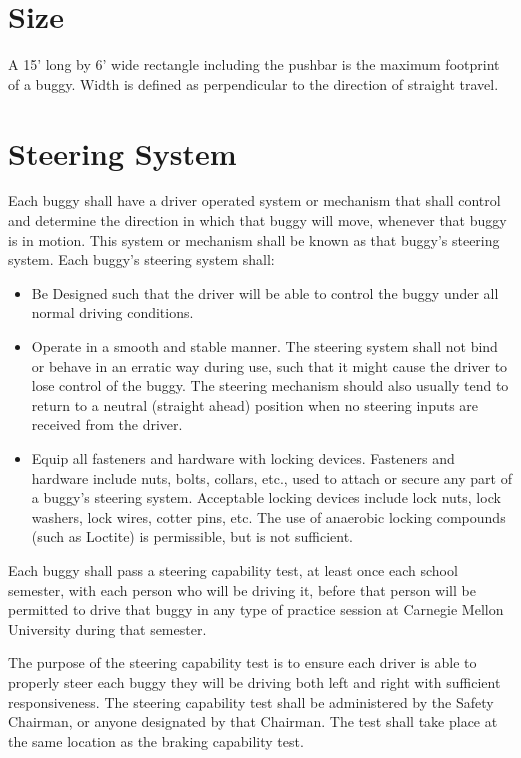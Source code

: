 \section{Size}

	A 15' long by 6' wide rectangle including the pushbar is the maximum footprint of a buggy. Width is defined as perpendicular to the direction of straight travel.

\section{Steering System}

	Each buggy shall have a driver operated system or mechanism that shall control and determine the direction in which that buggy will move, whenever that buggy is in motion. This system or mechanism shall be known as that buggy's steering system. Each buggy's steering system shall:

	\begin{itemize}

		\item
		Be Designed such that the driver will be able to control the buggy under all normal driving conditions.

		\item
		Operate in a smooth and stable manner. The steering system shall not bind or behave in an erratic way during use, such that it might cause the driver to lose control of the buggy. The steering mechanism should also usually tend to return to a neutral (straight ahead) position when no steering inputs are received from the driver.

		\item
		Equip all fasteners and hardware with locking devices. Fasteners and hardware include nuts, bolts, collars, etc., used to attach or secure any part of a buggy's steering system. Acceptable locking devices include lock nuts, lock washers, lock wires, cotter pins, etc. The use of anaerobic locking compounds (such as Loctite) is permissible, but is not sufficient.

	\end{itemize}

Each buggy shall pass a steering capability test, at least once each school semester, with each person who will be driving it, before that person will be permitted to drive that buggy in any type of practice session at Carnegie Mellon University during that semester. 

The purpose of the steering capability test is to ensure each driver is able to properly steer each buggy they will be driving both left and right with sufficient responsiveness. The steering capability test shall be administered by the Safety Chairman, or anyone designated by that Chairman. The test shall take place at the same location as the braking capability test. 

